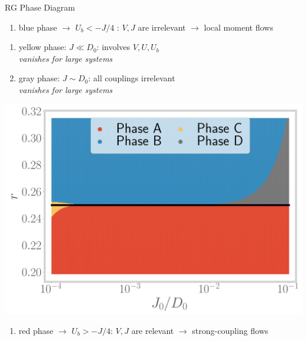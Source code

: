 \documentclass[8pt,aspectratio=169]{beamer}
\newcommand{\nitem}{\item[\ding{51}]}
\begin{document}
\begin{frame}{RG Phase Diagram}
\centering

\flushright
\begin{minipage}{0.7\textwidth}
\begin{enumerate}
\nitem blue phase \(\longrightarrow\) \(U_b < -J/4\) : \(V,J\) are \alert{irrelevant} \(\longrightarrow\) local moment flows
\end{enumerate}
\end{minipage}

\vspace*{\fill}

\begin{minipage}{0.45\textwidth}
\begin{enumerate}
\nitem yellow phase: \(J \ll D_0\): involves \alert{\(V,U,U_b\)}\\[5pt]
{\it vanishes for large systems}\\
\vspace*{40pt}
\nitem gray phase: \(J \sim D_0\): \alert{all} couplings irrelevant\\[5pt]
{\it vanishes for large systems}
\end{enumerate}
\end{minipage}
\hspace*{\fill}
\begin{minipage}{0.5\textwidth}
\includegraphics[width=\textwidth]{phase-map-MIT.png}
\end{minipage}

\vspace*{\fill}

\flushright
\begin{minipage}{0.7\textwidth}
\begin{enumerate}
\nitem red phase \(\longrightarrow\) \(U_b > -J/4\): \(V,J\) are \alert{relevant} \(\longrightarrow\) strong-coupling flows
\end{enumerate}
\end{minipage}

\end{frame}
\end{document}

